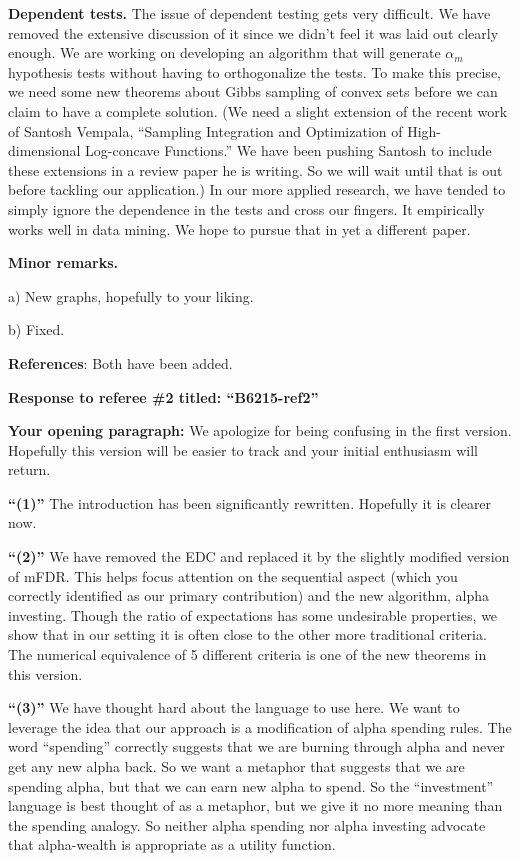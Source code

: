 \documentclass[12pt]{letter}
\begin{document}
{\bf Dependent tests.} The issue of dependent testing gets very
difficult.  We have removed the extensive discussion of it since we
didn't feel it was laid out clearly enough.  We are working on
developing an algorithm that will generate $\alpha_m$ hypothesis tests
without having to orthogonalize the tests.  To make this
precise, we need some new theorems about Gibbs sampling of convex sets
before we can claim to have a complete solution. (We need a slight
extension of the recent work of Santosh Vempala, ``Sampling
Integration and Optimization of High-dimensional Log-concave
Functions.''  We have been pushing Santosh to include these extensions
in a review paper he is writing.  So we will wait until that is out
before tackling our application.)  In our more applied research, we
have tended to simply ignore the dependence in the tests and cross our
fingers.  It empirically works well in data mining.  We hope to pursue
that in yet a different paper.

{\bf Minor remarks.} 

a) New graphs, hopefully to your liking.

b) Fixed.

{\bf References}: Both have been added.



\newpage
\centerline{\bf Response to referee \#2 titled: ``B6215-ref2''}

{\bf Your opening paragraph:} We apologize for being confusing in the
 first version.  Hopefully this version will be easier to track and
 your initial enthusiasm will return.

{\bf ``(1)''} The introduction has been significantly rewritten.
Hopefully it is clearer now. 

{\bf ``(2)''} We have removed the EDC and replaced it by the slightly modified version of mFDR.
This helps focus attention on the sequential aspect (which you
correctly identified as our primary contribution) and the new
algorithm, alpha investing.  Though the ratio of expectations has some
undesirable properties, we show that in our setting it is often close
to the other more traditional criteria.  The numerical equivalence of
5 different criteria is one of the new theorems in this version.

{\bf ``(3)''} We have thought hard about the language to use here.  We
want to leverage the idea that our approach is a modification of alpha
spending rules.  The word ``spending'' correctly suggests that we are
burning through alpha and never get any new alpha back.  So we want a
metaphor that suggests that we are spending alpha, but that we can
earn new alpha to spend.  So the ``investment'' language is best
thought of as a metaphor, but we give it no more meaning than the
spending analogy.  So neither alpha spending nor alpha investing
advocate that alpha-wealth is appropriate as a  utility function.
\end{document}
